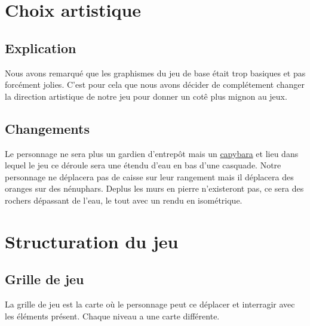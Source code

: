 \documentclass[french, 12pt]{article}
\begin{document}
\section{Choix artistique} %

    \subsection{Explication}
        Nous avons remarqué que les graphismes du jeu de base était trop basiques et pas forcément jolies. C'est pour cela que nous avons décider de complétement changer la direction artistique de notre jeu pour donner un cotê plus mignon au jeux.

    \subsection{Changements}
        Le personnage ne sera plus un gardien d'entrepôt mais un \href{https://fr.wikipedia.org/wiki/Hydrochoerus_hydrochaeris}{capybara} et lieu dans lequel le jeu ce déroule sera une étendu d'eau en bas d'une casquade. Notre personnage ne déplacera pas de caisse sur leur rangement mais il déplacera des oranges sur des nénuphars. 
        Deplus les murs en pierre n'existeront pas, ce sera des rochers dépassant de l'eau, le tout avec un rendu en isométrique.



\section{Structuration du jeu}

    \label{sec:Map}
    \subsection{Grille de jeu}
        La grille de jeu est la carte où le personnage peut ce déplacer et interragir avec les éléments présent. Chaque niveau a une carte différente.
\end{document}

